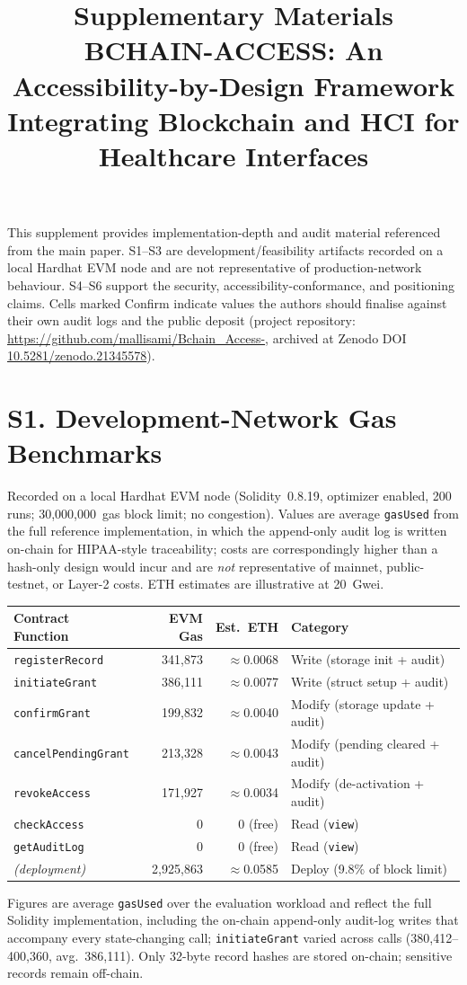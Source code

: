 \documentclass[10pt]{article}
\title{\textbf{Supplementary Materials}\\[3pt]\large BCHAIN-ACCESS: An Accessibility-by-Design Framework Integrating Blockchain and HCI for Healthcare Interfaces}
\date{}
\newcommand{\conf}{\textcolor{orange!80!black}{Confirm}}
\begin{document}
\maketitle
\noindent This supplement provides implementation-depth and audit material referenced from the main
paper. S1--S3 are development/feasibility artifacts recorded on a local Hardhat EVM node and are not
representative of production-network behaviour. S4--S6 support the security, accessibility-conformance,
and positioning claims. Cells marked \conf{} indicate values the authors should finalise against their
own audit logs and the public deposit (project repository: \url{https://github.com/mallisami/Bchain_Access-}, archived at Zenodo DOI \href{https://doi.org/10.5281/zenodo.21345578}{10.5281/zenodo.21345578}).

\section*{S1. Development-Network Gas Benchmarks}
Recorded on a local Hardhat EVM node (Solidity~0.8.19, optimizer enabled, 200 runs; 30{,}000{,}000~gas block limit; no congestion). Values are average \texttt{gasUsed} from the full reference implementation, in which the append-only audit log is written on-chain for HIPAA-style traceability; costs are correspondingly higher than a hash-only design would incur and are \emph{not} representative of mainnet, public-testnet, or Layer-2 costs. ETH estimates are illustrative at 20~Gwei.
\begin{center}\small\begin{tabular}{|l|r|r|l|}
\hline\textbf{Contract Function} & \textbf{EVM Gas} & \textbf{Est.\ ETH} & \textbf{Category}\\\hline
\texttt{registerRecord} & 341{,}873 & $\approx$0.0068 & Write (storage init + audit)\\\hline
\texttt{initiateGrant} & 386{,}111 & $\approx$0.0077 & Write (struct setup + audit)\\\hline
\texttt{confirmGrant} & 199{,}832 & $\approx$0.0040 & Modify (storage update + audit)\\\hline
\texttt{cancelPendingGrant} & 213{,}328 & $\approx$0.0043 & Modify (pending cleared + audit)\\\hline
\texttt{revokeAccess} & 171{,}927 & $\approx$0.0034 & Modify (de-activation + audit)\\\hline
\texttt{checkAccess} & 0 & 0 (free) & Read (\texttt{view})\\\hline
\texttt{getAuditLog} & 0 & 0 (free) & Read (\texttt{view})\\\hline
\textit{(deployment)} & 2{,}925{,}863 & $\approx$0.0585 & Deploy (9.8\% of block limit)\\\hline
\end{tabular}\end{center}
{\footnotesize Figures are average \texttt{gasUsed} over the evaluation workload and reflect the full Solidity implementation, including the on-chain append-only audit-log writes that accompany every state-changing call; \texttt{initiateGrant} varied across calls (380{,}412--400{,}360, avg.\ 386{,}111). Only 32-byte record hashes are stored on-chain; sensitive records remain off-chain.}
\end{document}
